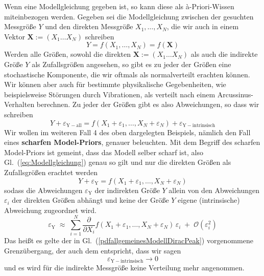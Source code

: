 Wenn eine Modellgleichung gegeben ist, so kann diese als {\`a}-Priori-Wissen miteinbezogen werden. 
Gegeben sei die Modellgleichung zwischen der gesuchten 
Messgröße $Y$ und den direkten Messgröße $X_1,\ldots, X_N$, die wir auch in einem
Vektor $\boldsymbol{X} := (X_1 \ldots  X_N)$ schreiben
\begin{equation}
Y = f(X_1,\ldots,X_N) = f(\boldsymbol{X})
\label{eq:Modellgleichung}
\end{equation}
Werden alle Größen, sowohl die direkten $\boldsymbol{X} := (X_1 \ldots  X_N)$ als
auch die indirekte Größe $Y$ als Zufallsgrößen angesehen, so gibt es zu jeder der
Größen eine stochastische Komponente, die wir oftmals als normalverteilt erachten können.
Wir können aber auch für bestimmte physikalische Gegebenheiten, wie beispielsweise Störungen
durch Vibrationen, als verteilt nach einem Arcussinus-Verhalten berechnen.
Zu jeder der Größen gibt es also Abweichungen, so dass wir schreiben
\begin{equation}
Y + \varepsilon_\mathrm{Y-all} = f(X_1 + \varepsilon_1,\ldots,X_N + \varepsilon_N) + \varepsilon_\mathrm{Y-intrinsisch}
\label{eq:ModellgleichungAlleZufall}
\end{equation}
Wir wollen im weiteren Fall 4 des oben dargelegten Beispiels, nämlich den Fall eines
\textbf{scharfen Model-Priors}, genauer beleuchten. Mit dem Begriff des scharfen
Model-Priors ist gemeint, dass das Modell
selber scharf ist, also Gl.~(\ref{eq:Modellgleichung}) genau so gilt und nur die direkten
Größen als Zufallsgrößen erachtet werden
\begin{equation}
Y + \varepsilon_\mathrm{Y} = f(X_1 + \varepsilon_1,\ldots,X_N + \varepsilon_N)
\label{eq:ModellgleichungDirekteZufall}
\end{equation}
sodass die Abweichungen $\varepsilon_\mathrm{Y}$ der indirekten Größe $Y$ allein von
den Abweichungen $\varepsilon_i$ der direkten Größen abhängt und keine der Größe
$Y$ eigene (intrinsische) Abweichung zugeordnet wird.
\begin{equation}
\varepsilon_\mathrm{Y} \; \approx \;
\sum\limits_{i=1}^N \frac{\partial}{\partial X_i} f(X_1 + \varepsilon_1,\ldots,X_N + \varepsilon_N)
\, \varepsilon_i \; + \; \mathcal{O}(\varepsilon_i^2)
\label{eq:epsilonY}
\end{equation}
Das heißt es gelte der in Gl.~(\ref{pdfallgemeinesModellDiracPeak}) vorgenommene
Grenzübergang, der auch dem entspricht, dass wir sagen
$$
\varepsilon_\mathrm{Y-intrinsisch} \rightarrow 0
$$
und es wird für die indirekte Messgröße keine Verteilung mehr angenommen.
